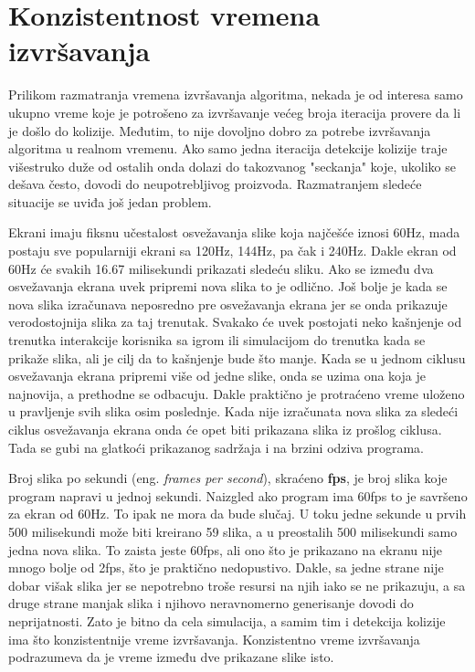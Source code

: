 \documentclass[12pt,oneside]{memoir}
\begin{document}
\section{Konzistentnost vremena izvršavanja}

Prilikom razmatranja vremena izvršavanja algoritma, nekada je od interesa 
samo ukupno vreme koje je potrošeno za izvršavanje većeg broja iteracija provere da li je došlo do kolizije. 
Međutim, to nije dovoljno dobro za potrebe izvršavanja algoritma u realnom vremenu.
Ako samo jedna iteracija 
detekcije kolizije traje višestruko duže od ostalih onda dolazi do takozvanog "seckanja"
koje, ukoliko se dešava često, dovodi do neupotrebljivog proizvoda.
Razmatranjem sledeće situacije se uviđa još jedan problem.

Ekrani imaju fiksnu učestalost osvežavanja slike koja najčešće iznosi 60Hz, mada postaju sve popularniji
ekrani sa 120Hz, 144Hz, pa čak i 240Hz. Dakle ekran od 60Hz će svakih 16.67 milisekundi prikazati sledeću sliku. 
Ako se između dva osvežavanja ekrana uvek pripremi nova slika to je odlično. 
Još bolje je kada se nova slika izračunava neposredno pre osvežavanja ekrana jer se onda 
prikazuje verodostojnija slika za taj trenutak. 
Svakako će uvek postojati neko kašnjenje od trenutka interakcije korisnika sa igrom ili simulacijom do
trenutka kada se prikaže slika, ali je cilj da to kašnjenje bude što manje. 
Kada se u jednom ciklusu osvežavanja ekrana pripremi više od jedne slike, onda se uzima ona koja je najnovija,
a prethodne se odbacuju. 
Dakle praktično je protraćeno vreme uloženo u pravljenje svih slika osim poslednje.
Kada nije izračunata nova slika za sledeći ciklus osvežavanja ekrana onda će opet biti prikazana slika
iz prošlog ciklusa. Tada se gubi na glatkoći prikazanog sadržaja i na brzini odziva programa. 

Broj slika po sekundi (eng. {\em frames per second}), skraćeno \textbf{fps}, je broj slika koje program napravi u jednoj sekundi.
Naizgled ako program ima 60fps to je savršeno za ekran od 60Hz. To ipak ne mora da bude slučaj.
U toku jedne sekunde u prvih 500 milisekundi može biti kreirano 59 slika, a u preostalih 500 milisekundi samo jedna nova slika. 
To zaista jeste 60fps, ali ono što je prikazano na ekranu nije mnogo bolje od 2fps, 
što je praktično nedopustivo. 
Dakle, sa jedne strane nije dobar višak slika jer se nepotrebno troše resursi na njih iako se ne prikazuju, 
a sa druge strane manjak slika i njihovo neravnomerno generisanje dovodi do neprijatnosti.
Zato je bitno da cela simulacija, a samim tim i detekcija kolizije ima što konzistentnije vreme izvršavanja.
Konzistentno vreme izvršavanja podrazumeva da je vreme između dve prikazane slike isto.
\end{document}
